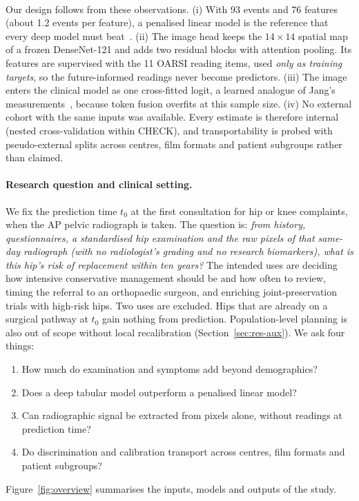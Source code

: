 \paragraph{}
Our design follows from these observations. (i) With 93 events and 76 features (about 1.2 events per feature), a
penalised linear model is the reference that every deep model must beat~\cite{christodoulou2019}. (ii) The image head
keeps the $14\times14$ spatial map of a frozen DenseNet-121 and adds two residual blocks with attention pooling. Its
features are supervised with the 11 OARSI reading items, used \emph{only as training targets}, so the future-informed
readings never become predictors. (iii) The image enters the clinical model as one cross-fitted logit, a learned
analogue of Jang's measurements~\cite{jang2023}, because token fusion overfits at this sample size. (iv) No external
cohort with the same inputs was available. Every estimate is therefore internal (nested cross-validation within CHECK),
and transportability is probed with pseudo-external splits across centres, film formats and patient subgroups rather
than claimed.

\paragraph{Research question and clinical setting.}
We fix the prediction time $t_0$ at the first consultation for hip or knee complaints, when the AP pelvic radiograph is
taken. The question is: \emph{from history, questionnaires, a standardised hip examination and the raw pixels of that
same-day radiograph (with no radiologist's grading and no research biomarkers), what is this hip's risk of replacement
within ten years?} The intended uses are deciding how intensive conservative management should be and how often to
review, timing the referral to an orthopaedic surgeon, and enriching joint-preservation trials with high-risk hips. Two
uses are excluded. Hips that are already on a surgical pathway at $t_0$ gain nothing from prediction. Population-level
planning is also out of scope without local recalibration (Section~\ref{sec:res-aux}). We ask four things:
\begin{enumerate}[leftmargin=*,itemsep=0pt,topsep=2pt]
  \item How much do examination and symptoms add beyond demographics?
  \item Does a deep tabular model outperform a penalised linear model?
  \item Can radiographic signal be extracted from pixels alone, without readings at prediction time?
  \item Do discrimination and calibration transport across centres, film formats and patient subgroups?
\end{enumerate}
Figure~\ref{fig:overview} summarises the inputs, models and outputs of the study.


